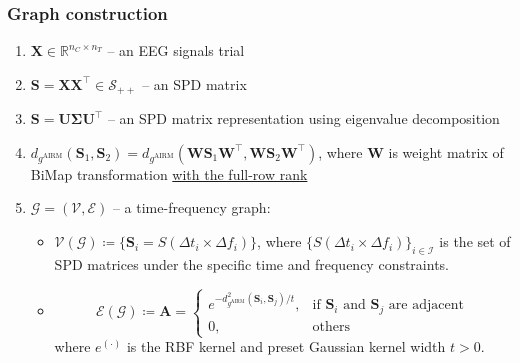 \documentclass{beamer}
\begin{document}
\begin{frame}
\frametitle{Graph construction}
\begin{enumerate}
\item $\mathbf{X} \in \mathbb{R}^{n_C \times n_T}$ -- an EEG signals trial

\item $\mathbf{S} = \mathbf{X} \mathbf{X}^{\top} \in \mathcal{S}_{++}$ -- an SPD matrix

\item $\mathbf{S} = \mathbf{U} \mathbf{\Sigma} \mathbf{U}^{\top}$ -- an SPD matrix representation using eigenvalue decomposition

\item $d_{g^{\text{AIRM}}} (\mathbf{S}_1, \mathbf{S}_2) = d_{g^{\text{AIRM}}} (\mathbf{W} \mathbf{S}_1 \mathbf{W}^{\top}, \mathbf{W} \mathbf{S}_2 \mathbf{W}^{\top})$, where $\mathbf{W}$ is weight matrix of BiMap transformation \underline{with the full-row rank}

\item $\mathcal{G} = (\mathcal{V}, \mathcal{E})$ -- a time-frequency graph:
\begin{itemize}
	\item $\mathcal{V}(\mathcal{G}) \coloneqq \{\mathbf{S}_i = S(\Delta t_i \times \Delta f_i)\}$, where $\{S(\Delta t_i \times \Delta f_i)\}_{i \in \mathcal{I}}$ is the set of SPD matrices under the specific time and frequency constraints.
	
	\item \[
			\mathcal{E}(\mathcal{G}) \coloneqq \mathbf{A} =
			\begin{cases}
				e^{-d^2_{g^{\text{AIRM}}} (\mathbf{S}_i, \mathbf{S}_j) / t}, & \text{if $\mathbf{S}_i$ and $\mathbf{S}_j$ are adjacent} \\
				0, & \text{others}
			\end{cases}
		  \] where $e^{(\cdot)}$ is the RBF kernel and preset Gaussian kernel width $t > 0$.
\end{itemize}
\end{enumerate}
\end{frame}

\end{document}
